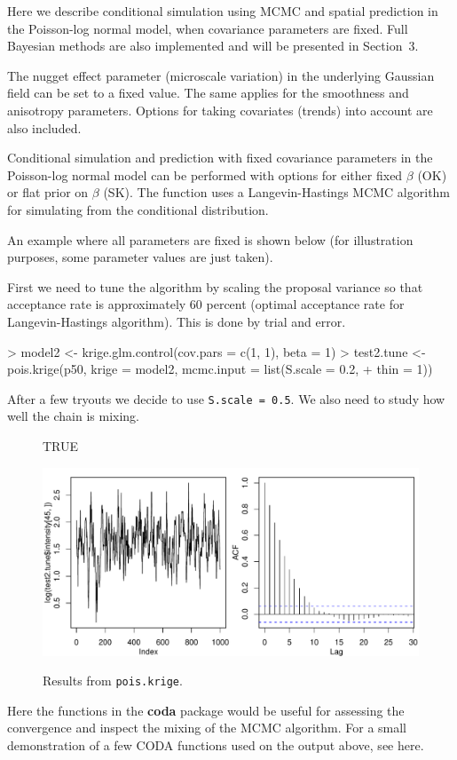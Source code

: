 \documentclass[12pt,a4paper]{article}
\newcommand{\strong}[1]{{\textbf{ #1}}}
\let\pkg=\strong
\newcommand{\code}[1]{\texttt{\small #1}}
\begin{document}
Here we describe conditional simulation using MCMC and spatial prediction in the Poisson-log normal model,  when covariance parameters are fixed.
Full Bayesian methods are also implemented and will be presented in Section~3. 

The nugget effect parameter (microscale variation) in the underlying Gaussian field can be set to a fixed value. 
The same applies for the smoothness and anisotropy parameters. Options for taking covariates (trends) into 
account are also included.

Conditional simulation and prediction with fixed covariance parameters in the Poisson-log normal model can be performed 
with options for either fixed $\beta$ (OK) or flat prior on $\beta$ (SK).
The function uses a Langevin-Hastings MCMC algorithm for simulating from the conditional distribution.

An example where all parameters are fixed is shown below (for illustration purposes, some parameter values are just taken).  

First we need to tune the algorithm by scaling the proposal variance so that acceptance rate is approximately 60 percent (optimal
acceptance rate for Langevin-Hastings algorithm). This is done by trial and error. 
\begin{Schunk}
\begin{Sinput}
> model2 <- krige.glm.control(cov.pars = c(1, 1), beta = 1)
> test2.tune <- pois.krige(p50, krige = model2, mcmc.input = list(S.scale = 0.2, 
+     thin = 1))
\end{Sinput}
\end{Schunk}
After a few tryouts we decide to use \code{S.scale = 0.5}.
We also need to study how well the chain is mixing.
\begin{figure}[h!]
\centering
\begin{Schunk}
\begin{Soutput}
[1] TRUE
\end{Soutput}
\end{Schunk}
\includegraphics{geoRglmintro-006}
\label{fig:pois.krige}
\caption{Results from \texttt{pois.krige}.}
\end{figure}    
Here the functions in the \pkg{coda} package would be useful for assessing the convergence and inspect the mixing of the MCMC 
algorithm. For a small demonstration of a few CODA functions used on 
the output above, see here.
\end{document}
